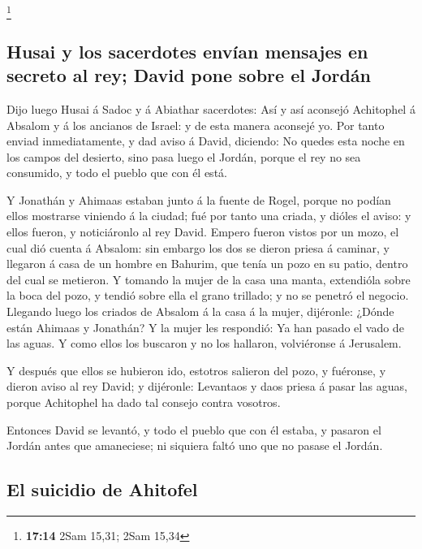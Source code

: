 \footnote{\textbf{17:14} 2Sam 15,31; 2Sam 15,34}

\hypertarget{husai-y-los-sacerdotes-envuxedan-mensajes-en-secreto-al-rey-david-pone-sobre-el-jorduxe1n}{%
\subsection{Husai y los sacerdotes envían mensajes en secreto al rey;
David pone sobre el
Jordán}\label{husai-y-los-sacerdotes-envuxedan-mensajes-en-secreto-al-rey-david-pone-sobre-el-jorduxe1n}}

 Dijo luego Husai á Sadoc y á Abiathar sacerdotes: Así y
así aconsejó Achitophel á Absalom y á los ancianos de Israel: y de esta
manera aconsejé yo.  Por tanto enviad inmediatamente, y
dad aviso á David, diciendo: No quedes esta noche en los campos del
desierto, sino pasa luego el Jordán, porque el rey no sea consumido, y
todo el pueblo que con él está.

 Y Jonathán y Ahimaas estaban junto á la fuente de Rogel,
porque no podían ellos mostrarse viniendo á la ciudad; fué por tanto una
criada, y dióles el aviso: y ellos fueron, y noticiáronlo al rey David.
 Empero fueron vistos por un mozo, el cual dió cuenta á
Absalom: sin embargo los dos se dieron priesa á caminar, y llegaron á
casa de un hombre en Bahurim, que tenía un pozo en su patio, dentro del
cual se metieron.  Y tomando la mujer de la casa una
manta, extendióla sobre la boca del pozo, y tendió sobre ella el grano
trillado; y no se penetró el negocio.  Llegando luego los
criados de Absalom á la casa á la mujer, dijéronle: ¿Dónde están Ahimaas
y Jonathán? Y la mujer les respondió: Ya han pasado el vado de las
aguas. Y como ellos los buscaron y no los hallaron, volviéronse á
Jerusalem.

 Y después que ellos se hubieron ido, estotros salieron
del pozo, y fuéronse, y dieron aviso al rey David; y dijéronle:
Levantaos y daos priesa á pasar las aguas, porque Achitophel ha dado tal
consejo contra vosotros.

 Entonces David se levantó, y todo el pueblo que con él
estaba, y pasaron el Jordán antes que amaneciese; ni siquiera faltó uno
que no pasase el Jordán.

\hypertarget{el-suicidio-de-ahitofel}{%
\subsection{El suicidio de Ahitofel}\label{el-suicidio-de-ahitofel}}

